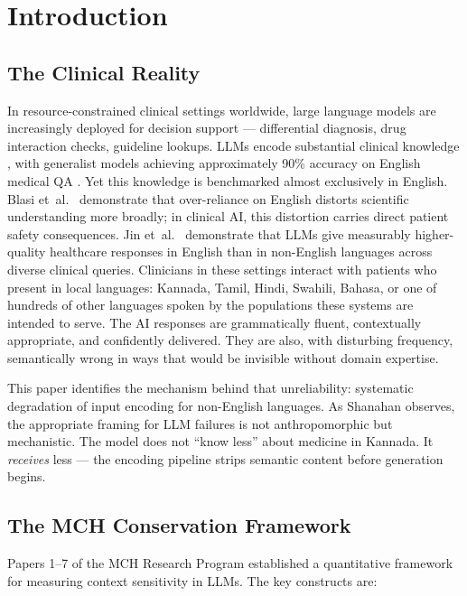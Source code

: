 \documentclass[11pt,a4paper]{article}
\begin{document}
\section{Introduction}

\subsection{The Clinical Reality}

In resource-constrained clinical settings worldwide, large language models are increasingly deployed for decision support --- differential diagnosis, drug interaction checks, guideline lookups. LLMs encode substantial clinical knowledge \citep{singhal2023}, with generalist models achieving approximately 90\% accuracy on English medical QA \citep{nori2023}. Yet this knowledge is benchmarked almost exclusively in English. Blasi et~al.\ \citep{blasi2022} demonstrate that over-reliance on English distorts scientific understanding more broadly; in clinical AI, this distortion carries direct patient safety consequences. Jin et~al.\ \citep{jin2024} demonstrate that LLMs give measurably higher-quality healthcare responses in English than in non-English languages across diverse clinical queries. Clinicians in these settings interact with patients who present in local languages: Kannada, Tamil, Hindi, Swahili, Bahasa, or one of hundreds of other languages spoken by the populations these systems are intended to serve. The AI responses are grammatically fluent, contextually appropriate, and confidently delivered. They are also, with disturbing frequency, semantically wrong in ways that would be invisible without domain expertise.

This paper identifies the mechanism behind that unreliability: systematic degradation of input encoding for non-English languages. As Shanahan \citep{shanahan2024} observes, the appropriate framing for LLM failures is not anthropomorphic but mechanistic. The model does not ``know less'' about medicine in Kannada. It \emph{receives} less --- the encoding pipeline strips semantic content before generation begins.

\subsection{The MCH Conservation Framework}

Papers 1--7 of the MCH Research Program \citep{laxman2026b,laxman2026d,laxman2026e,laxman2026f,laxman2026g} established a quantitative framework for measuring context sensitivity in LLMs. The key constructs are:
\end{document}
